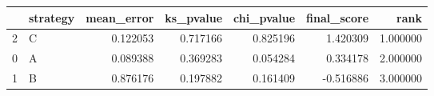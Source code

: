 \begin{tabular}{llrrrrr}
\toprule
 & strategy & mean_error & ks_pvalue & chi_pvalue & final_score & rank \\
\midrule
2 & C & 0.122053 & 0.717166 & 0.825196 & 1.420309 & 1.000000 \\
0 & A & 0.089388 & 0.369283 & 0.054284 & 0.334178 & 2.000000 \\
1 & B & 0.876176 & 0.197882 & 0.161409 & -0.516886 & 3.000000 \\
\bottomrule
\end{tabular}
